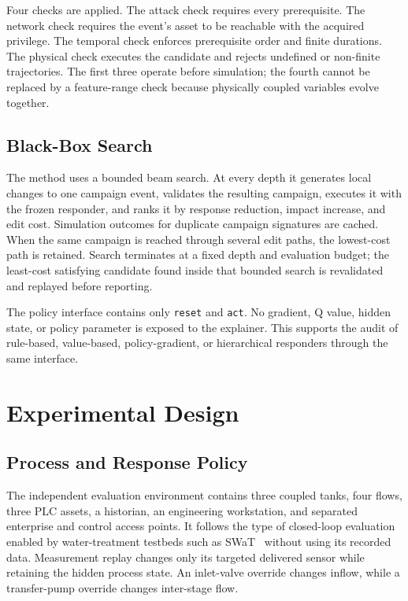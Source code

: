 \documentclass[conference]{IEEEtran}
\begin{document}
Four checks are applied. The attack check requires every prerequisite. The
network check requires the event's asset to be reachable with the acquired
privilege. The temporal check enforces prerequisite order and finite durations.
The physical check executes the candidate and rejects undefined or non-finite
trajectories. The first three operate before simulation; the fourth cannot be
replaced by a feature-range check because physically coupled variables evolve
together.

\subsection{Black-Box Search}

The method uses a bounded beam search. At every depth it generates local changes
to one campaign event, validates the resulting campaign, executes it with the
frozen responder, and ranks it by response reduction, impact increase, and edit
cost. Simulation outcomes for duplicate campaign signatures are cached. When
the same campaign is reached through several edit paths, the lowest-cost path
is retained. Search terminates at a fixed depth and evaluation budget; the
least-cost satisfying candidate found inside that bounded search is revalidated
and replayed before reporting.

The policy interface contains only \texttt{reset} and \texttt{act}. No gradient,
Q value, hidden state, or policy parameter is exposed to the explainer. This
supports the audit of rule-based, value-based, policy-gradient, or hierarchical
responders through the same interface.

\section{Experimental Design}

\subsection{Process and Response Policy}

The independent evaluation environment contains three coupled tanks, four
flows, three PLC assets, a historian, an engineering workstation, and separated
enterprise and control access points. It follows the type of closed-loop
evaluation enabled by water-treatment testbeds such as SWaT~\cite{mathur2016swat}
without using its recorded data. Measurement replay changes only its targeted
delivered sensor while retaining the hidden process state. An inlet-valve
override changes inflow, while a transfer-pump override changes inter-stage
flow.
\end{document}
